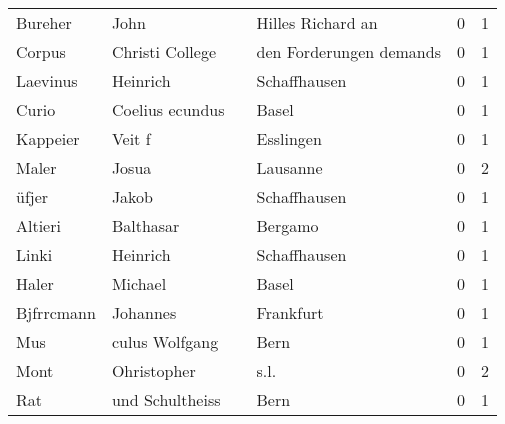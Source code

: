 \begin{tabular}{llllrr}
                  Bureher &                               John &             &                           Hilles Richard an &          0 &         1 \\
                   Corpus &                    Christi College &             &                     den Forderungen demands &          0 &         1 \\
                 Laevinus &                           Heinrich &             &                                Schaffhausen &          0 &         1 \\
                    Curio &                    Coelius ecundus &             &                                       Basel &          0 &         1 \\
                 Kappeier &                             Veit f &             &                                   Esslingen &          0 &         1 \\
                    Maler &                              Josua &             &                                    Lausanne &          0 &         2 \\
                    üfjer &                              Jakob &             &                                Schaffhausen &          0 &         1 \\
                  Altieri &                          Balthasar &             &                                     Bergamo &          0 &         1 \\
                    Linki &                           Heinrich &             &                                Schaffhausen &          0 &         1 \\
                    Haler &                            Michael &             &                                       Basel &          0 &         1 \\
               Bjfrrcmann &                           Johannes &             &                                   Frankfurt &          0 &         1 \\
                      Mus &                     culus Wolfgang &             &                                        Bern &          0 &         1 \\
                     Mont &                        Ohristopher &             &                                        s.l. &          0 &         2 \\
                      Rat &                    und Schultheiss &             &                                        Bern &          0 &         1 \\

\end{tabular}
